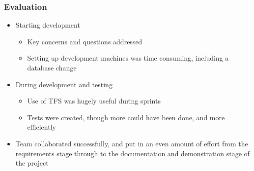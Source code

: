 \documentclass[10pt, compress]{beamer}
\begin{document}
%  
%   
%   	
%   	
%   	
%   	
%   	
%   	
%   
%   




\begin{frame}[fragile]
\frametitle{Evaluation}

\begin{itemize}
	\item Starting development
		\begin{itemize}
			\item Key concerns and questions addressed
			\item Setting up development machines was time consuming, including a database change
		\end{itemize}
	\item During development and testing
		\begin{itemize}
			\item Use of TFS was hugely useful during sprints
			\item Tests were created, though more could have been done, and more efficiently
		\end{itemize}
	\item Team collaborated successfully, and put in an even amount of effort from the requirements stage through to the documentation and demonstration stage of the project
\end{itemize}
\end{frame}
\end{document}
